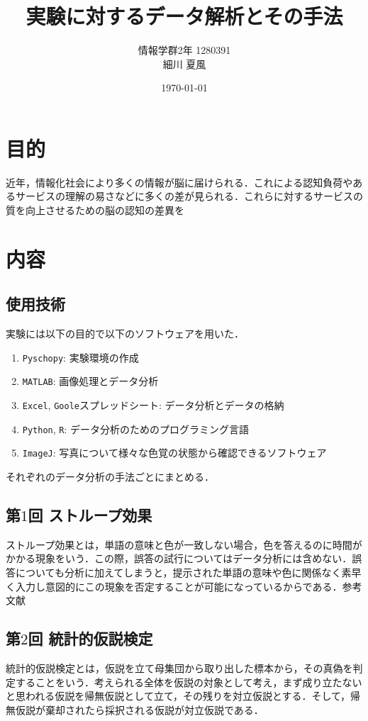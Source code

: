 \documentclass{jlreq}
\title{実験に対するデータ解析とその手法}
\author{情報学群2年 1280391\\ 細川 夏風}
\date{\today}
\begin{document}
  \maketitle


  \section{目的}
  近年，情報化社会により多くの情報が脳に届けられる．これによる認知負荷やあるサービスの理解の易さなどに多くの差が見られる．これらに対するサービスの質を向上させるための脳の認知の差異を

  \section{内容}
  \subsection*{使用技術}
  実験には以下の目的で以下のソフトウェアを用いた．
  \begin{enumerate}[(1). ]
    \item \verb|Pyschopy|: 実験環境の作成
    \item \verb|MATLAB|: 画像処理とデータ分析
    \item \verb|Excel|, \verb|Goole|スプレッドシート: データ分析とデータの格納
    \item \verb|Python|, \verb|R|: データ分析のためのプログラミング言語
    \item \verb|ImageJ|: 写真について様々な色覚の状態から確認できるソフトウェア
  \end{enumerate}
    それぞれのデータ分析の手法ごとにまとめる．
    \subsection*{第$1$回 ストループ効果}
    ストループ効果とは，単語の意味と色が一致しない場合，色を答えるのに時間がかかる現象をいう．この際，誤答の試行についてはデータ分析には含めない．誤答についても分析に加えてしまうと，提示された単語の意味や色に関係なく素早く入力し意図的にこの現象を否定することが可能になっているからである．\leftarrow 参考文献

    \subsection*{第$2$回 統計的仮説検定}
    統計的仮説検定とは，仮説を立て母集団から取り出した標本から，その真偽を判定することをいう．考えられる全体を仮説の対象として考え，まず成り立たないと思われる仮説を帰無仮説として立て，その残りを対立仮説とする．そして，帰無仮説が棄却されたら採択される仮説が対立仮説である\cite{step}．
\end{document}
